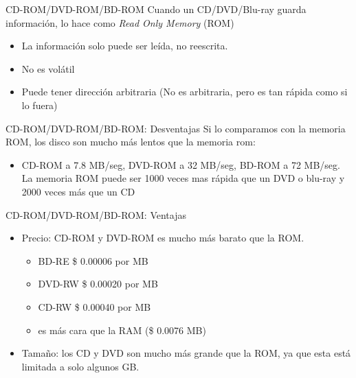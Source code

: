\documentclass[11pt]{beamer}
\begin{document}
		\begin{frame}{CD-ROM/DVD-ROM/BD-ROM}
			Cuando un CD/DVD/Blu-ray guarda información, lo hace como \textit{Read Only Memory} (ROM)
			\begin{itemize}
				\item La información solo puede ser leída, no reescrita.
				\item No es volátil
				\item Puede tener dirección arbitraria (No es arbitraria, pero es tan rápida como si lo fuera)
			\end{itemize}
		\end{frame}
		\begin{frame}{CD-ROM/DVD-ROM/BD-ROM: Desventajas}
			Si lo comparamos con la memoria ROM, los disco son mucho más lentos que la memoria rom:
			\begin{itemize}
				\item CD-ROM a 7.8 MB/seg, DVD-ROM a 32 MB/seg, BD-ROM a 72 MB/seg. La memoria ROM puede ser 1000 veces mas rápida que un DVD o blu-ray y 2000 veces más que un CD
			\end{itemize}
		\end{frame}
		\begin{frame}{CD-ROM/DVD-ROM/BD-ROM: Ventajas}
			\begin{itemize}
				\item Precio: CD-ROM y DVD-ROM es mucho más barato que la ROM.
				\begin{itemize}
					\item BD-RE \$ 0.00006 por MB
					\item DVD-RW \$ 0.00020 por MB
					\item CD-RW \$ 0.00040 por MB
					\item es más cara que la RAM (\$ 0.0076 MB)
				\end{itemize}
				\item Tamaño: los CD y DVD son mucho más grande que la ROM, ya que esta está limitada a solo algunos GB.
			\end{itemize}
		\end{frame}
\end{document}
